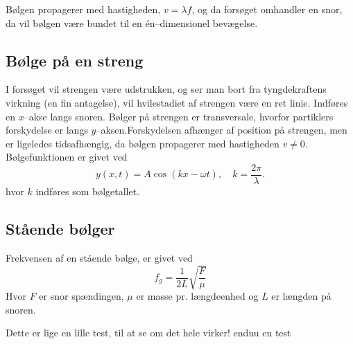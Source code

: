 \documentclass[A2_main.tex]{subfiles}
\begin{document}
Bølgen propagerer med hastigheden, $v = \lambda f$, og da forsøget omhandler en snor, da vil bølgen være bundet til en én--dimensionel bevægelse.

\subsection{Bølge på en streng}
I forsøget vil strengen være udstrukken, og ser man bort fra tyngdekraftens virkning (en fin antagelse), vil hvilestadiet af strengen være en ret linie. Indføres en $x$--akse langs snoren. Bølger på strengen er transversale, hvorfor partiklers forskydelse er langs $y$--aksen.Forskydelsen afhænger af position på strengen, men er ligeledes tidsafhængig, da bølgen propagerer med hastigheden $v\neq 0$. Bølgefunktionen er givet ved
\begin{equation}
    y(x, t) = A\cos(kx -\omega t), \quad k = \frac{2\pi}{\lambda}.
    \label{eq: wave}
\end{equation}
hvor $k$ indføres som bølgetallet.





\subsection{Stående bølger}




Frekvensen af en stående bølge, er givet ved
\begin{equation}
 f_g = \frac{1}{2L}\sqrt{\frac{F}{\mu}}
 \label{eq: swave}
\end{equation}
Hvor $F$ er snor spændingen, $\mu$ er masse pr. længdeenhed og $L$ er længden på snoren.

Dette er lige en lille test, til at se om det hele virker!
endnu en test
\end{document}
